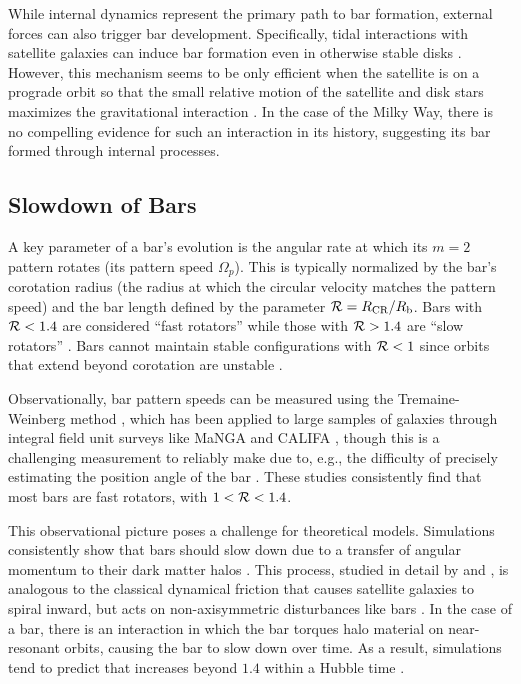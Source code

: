 While internal dynamics represent the primary path to bar formation, external forces can also trigger bar development. Specifically, tidal interactions with satellite galaxies can induce bar formation even in otherwise stable disks \citep{1986A&A...166...75B}. However, this mechanism seems to be only efficient when the satellite is on a prograde orbit so that the small relative motion of the satellite and disk stars maximizes the gravitational interaction \citep[e.g.][]{2018ApJ...857....6L}. In the case of the Milky Way, there is no compelling evidence for such an interaction in its history, suggesting its bar formed through internal processes.

\subsection{Slowdown of Bars}
A key parameter of a bar's evolution is the angular rate at which its $m=2$ pattern rotates (its pattern speed $\Omega_p$). This is typically normalized by the bar's corotation radius (the radius at which the circular velocity matches the pattern speed) and the bar length defined by the parameter $\mathcal{R}=R_{\textrm{CR}}/R_{\textrm{b}}$. Bars with $\mathcal{R} < 1.4$ are considered ``fast rotators'' while those with $\mathcal{R} > 1.4$ are ``slow rotators'' \citep{2000ApJ...543..704D}. Bars cannot maintain stable configurations with $\mathcal{R} < 1$ since orbits that extend beyond corotation are unstable \citep{1980A&A....81..198C}.

Observationally, bar pattern speeds can be measured using the Tremaine-Weinberg method \citep{1984ApJ...282L...5T}, which has been applied to large samples of galaxies through integral field unit surveys like MaNGA and CALIFA \citep{2019MNRAS.482.1733G, 2015A&A...576A.102A}, though this is a challenging measurement to reliably make due to, e.g., the difficulty of precisely estimating the position angle of the bar \citep{2019ApJ...884...23Z}. These studies consistently find that most bars are fast rotators, with $1 < \mathcal{R} < 1.4$.

This observational picture poses a challenge for theoretical models. Simulations consistently show that bars should slow down due to a transfer of angular momentum to their dark matter halos \citep{1981A&A....96..164C, 2000ApJ...543..704D}. This process, studied in detail by \citet{1984MNRAS.209..729T} and \citet{1985MNRAS.213..451W}, is analogous to the classical dynamical friction that causes satellite galaxies to spiral inward, but acts on non-axisymmetric disturbances like bars \citep{1972MNRAS.157....1L}. In the case of a bar, there is an interaction in which the bar torques halo material on near-resonant orbits, causing the bar to slow down over time. As a result, simulations tend to predict that \Rot{} increases beyond $1.4$ within a Hubble time \citep{2000ApJ...543..704D}.

